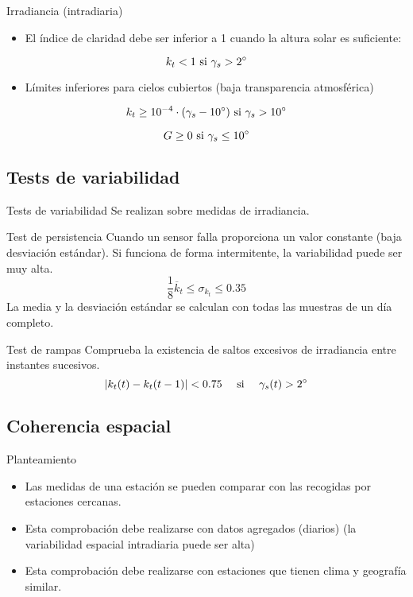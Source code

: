\documentclass[aspectratio=169, usenames,svgnames,dvipsnames]{beamer}
\begin{document}
\begin{frame}[label={sec:org359f3f9}]{Irradiancia (intradiaria)}
\begin{itemize}
\item El índice de claridad debe ser inferior a 1 cuando la altura solar es suficiente:
\end{itemize}
\[
k_t < 1  \text{ si } \gamma_s > 2\degree 
\]
\begin{itemize}
\item Límites inferiores para cielos cubiertos (baja transparencia atmosférica)
\end{itemize}
\[
k_t \geq 10^{-4} \cdot (\gamma_s - 10\degree)  \text{ si } \gamma_s > 10\degree
\]

\[
G \geq 0  \text{ si } \gamma_s \leq 10\degree
\]

\nocite{Journee.Bertrand2011}
\end{frame}

\subsection{Tests de variabilidad}
\label{sec:orga59091e}

\begin{frame}[label={sec:orgfe0ecb5}]{Tests de variabilidad}
Se realizan sobre medidas de \alert{irradiancia}.

\begin{block}{Test de persistencia}
Cuando un sensor falla proporciona un valor constante (baja desviación estándar). Si funciona de forma intermitente, la variabilidad puede ser muy alta.
\[
\frac{1}{8} \overline{k}_t \leq \sigma_{k_t} \leq 0.35
\]
La media y la desviación estándar se calculan con todas las muestras de un día completo.
\end{block}

\begin{block}{Test de rampas}
Comprueba la existencia de saltos excesivos de irradiancia entre instantes sucesivos.
\[
\left| k_t(t) - k_t(t-1)\right| < 0.75 \quad \text{ si } \quad \gamma_s(t) > 2\degree
\]
\end{block}
\end{frame}

\subsection{Coherencia espacial}
\label{sec:org4dad102}
\begin{frame}[label={sec:org2d0fa06}]{Planteamiento}
\begin{itemize}
\item Las medidas de una estación se pueden comparar con las recogidas por estaciones cercanas.
\item Esta comprobación debe realizarse con \alert{datos agregados} (diarios) (la variabilidad espacial intradiaria puede ser alta)
\item Esta comprobación debe realizarse con estaciones que tienen \alert{clima y geografía similar}.
\end{itemize}

\nocite{Journee.Bertrand2011}
\end{frame}
\end{document}
